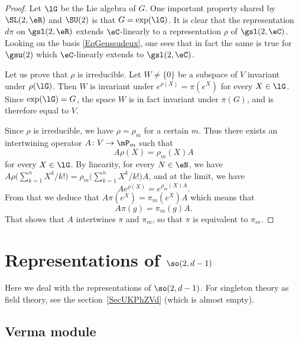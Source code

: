 \begin{proof}
Let $\lG$ be the Lie algebra of $G$. One important property shared by $\SL(2,\eR)$ and $\SU(2)$ is that $G=\exp(\lG)$. It is clear that the representation $d\pi$ on $\gsl(2,\eR)$ extends $\eC$-linearly to a representation $\rho$ of $\gsl(2,\eC)$. Looking on the basis \eqref{EqGenssudeux}, one sees that in fact the same is true for $\gsu(2)$ which $\eC$-linearly extends to $\gsl(2,\eC)$.

Let us prove that $\rho$ is irreducible. Let $W\neq\{ 0 \}$ be a subspace of $V$ invariant under $\rho(\lG)$. Then $W$ is invariant under $ e^{\rho(X)}=\pi( e^{X})$ for every $X\in\lG$. Since $\exp(\lG)=G$, the space $W$ is in fact invariant under $\pi(G)$, and is therefore equal to $V$.

Since $\rho$ is irreducible, we have $\rho=\rho_m$ for a certain $m$. Thus there exists an intertwining operator $A\colon V\to \mP_m$ such that
\[
	A\rho(X)=\rho_m(X)A
\]
for every $X\in\lG$. By linearity, for every $N\in\eN$, we have $A\rho\big( \sum_{k=1}^n X^k/k! \big)=\rho_m\big( \sum_{k=1}^n X^k/k! \big)A$, and at the limit, we have
\begin{equation}
	A e^{\rho(X)}= e^{\rho_m(X)A}.
\end{equation}
From that we deduce that $A\pi( e^{X})=\pi_m( e^{X})A$ which means that
\[
	A\pi(g)=\pi_m(g)A.
\]
That shows that $A$ intertwines $\pi$ and $\pi_m$, so that $\pi$ is equivalent to $\pi_m$.
\end{proof}
\section{Representations of \texorpdfstring{$\so(2,d-1)$}{so2d}}

Here we deal with the representations of \( \so(2,d-1)\). For singleton theory as field theory, see the section~\ref{SecUKPhZVd} (which is almost empty).

\subsection{Verma module}

